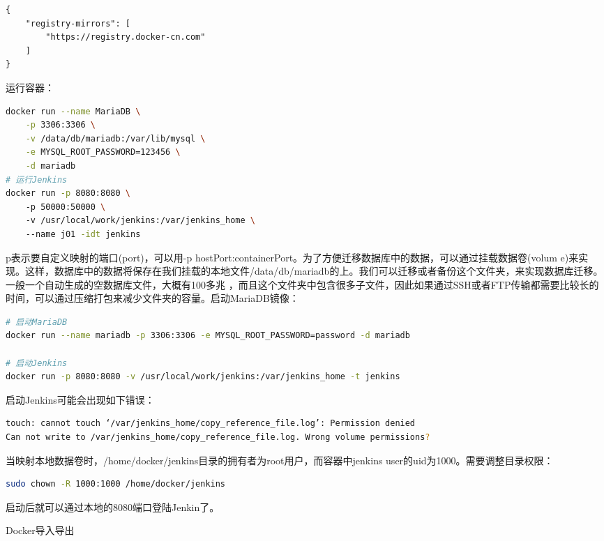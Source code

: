 \documentclass[8pt]{book}
\makeatletter
\numberwithin{dummy}{section}
\theoremstyle{ocrenumbox}
\theoremstyle{blacknumex}
\theoremstyle{blacknumbox}
\theoremstyle{ocrenum}
\renewcommand{\subsection}{\@startsection {subsection}{2}{\z@}
	{-3ex \@plus -0.1ex \@minus -.4ex}
	{0.5ex \@plus.2ex }
	{\normalfont\sffamily\bfseries}}
\makeatother
\begin{document}
\begin{lstlisting}
{
	"registry-mirrors": [
		"https://registry.docker-cn.com"
	]
}
\end{lstlisting}

运行容器：

\begin{lstlisting}[language=Bash]
docker run --name MariaDB \
	-p 3306:3306 \
	-v /data/db/mariadb:/var/lib/mysql \
	-e MYSQL_ROOT_PASSWORD=123456 \
	-d mariadb
# 运行Jenkins
docker run -p 8080:8080 \ 
	-p 50000:50000 \ 
	-v /usr/local/work/jenkins:/var/jenkins_home \ 
	--name j01 -idt jenkins
\end{lstlisting}

p表示要自定义映射的端口(port)，可以用-p hostPort:containerPort。为了方便迁移数据库中的数据，可以通过挂载数据卷(volum	e)来实现。这样，数据库中的数据将保存在我们挂载的本地文件/data/db/mariadb的上。我们可以迁移或者备份这个文件夹，来实现数据库迁移。一般一个自动生成的空数据库文件，大概有100多兆 ，而且这个文件夹中包含很多子文件，因此如果通过SSH或者FTP传输都需要比较长的时间，可以通过压缩打包来减少文件夹的容量。启动MariaDB镜像：

\begin{lstlisting}[language=Bash]
# 启动MariaDB
docker run --name mariadb -p 3306:3306 -e MYSQL_ROOT_PASSWORD=password -d mariadb

# 启动Jenkins
docker run -p 8080:8080 -v /usr/local/work/jenkins:/var/jenkins_home -t jenkins
\end{lstlisting}

启动Jenkins可能会出现如下错误：

\begin{lstlisting}[language=Bash]
touch: cannot touch ‘/var/jenkins_home/copy_reference_file.log’: Permission denied
Can not write to /var/jenkins_home/copy_reference_file.log. Wrong volume permissions?
\end{lstlisting}

当映射本地数据卷时，/home/docker/jenkins目录的拥有者为root用户，而容器中jenkins user的uid为1000。需要调整目录权限：

\begin{lstlisting}[language=Bash]
sudo chown -R 1000:1000 /home/docker/jenkins
\end{lstlisting}

启动后就可以通过本地的8080端口登陆Jenkin了。

\subsection{Docker导入导出}
\end{document}
